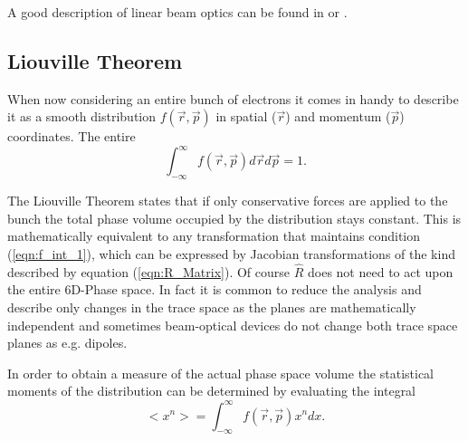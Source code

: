 A good description of linear beam optics can be found in \cite{Wiedemann_accelerator} or \cite{Book_Fundamentals_Rosenzweig}.
\subsection{Liouville Theorem}
When now considering an entire bunch of electrons it comes in handy to describe it as a smooth distribution
$f(\vec{r},\vec{p})$ in spatial ($\vec{r}$) and momentum ($\vec{p}$) coordinates. The entire  
\begin{equation}
\label{eqn:f_int_1}
\int^{\infty}_{-\infty}f(\vec{r},\vec{p})d\vec{r}d\vec{p}=1 .
\end{equation}


The Liouville Theorem states that if only conservative forces are applied to the bunch the total phase volume occupied by the distribution stays constant. This is mathematically equivalent to any transformation that maintains condition (\ref{eqn:f_int_1}), which can be expressed by Jacobian transformations of the kind described by equation (\ref{eqn:R_Matrix}).
Of course $\hat{R}$ does not need to act upon the entire 6D-Phase space. In fact it is common to reduce the analysis and describe only changes in the trace space as the planes are mathematically independent and sometimes beam-optical devices do not change both  trace space planes as e.g. dipoles.

In order to obtain a measure of the actual phase space volume the statistical moments of the distribution can be determined by evaluating the integral 
\begin{equation}
<x^n>=\int_{-\infty}^{\infty}f(\vec{r},\vec{p})x^n dx.
\end{equation}

